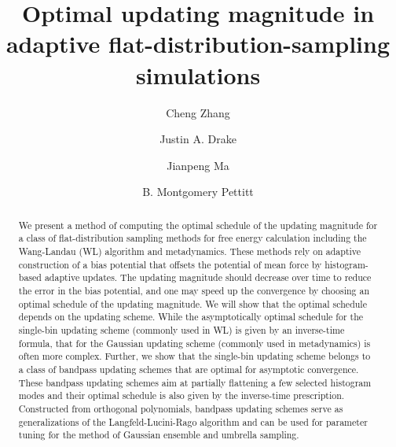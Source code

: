 \documentclass[preprint, superscriptaddress, floatfix]{revtex4-1}
\begin{document}
\title{Optimal updating magnitude in adaptive flat-distribution-sampling simulations}

\author{Cheng Zhang}
\author{Justin A. Drake}
\author{Jianpeng Ma}
\author{B. Montgomery Pettitt}



\begin{abstract}
  We present a method of computing the optimal schedule
  of the updating magnitude
  for a class of flat-distribution sampling methods
  for free energy calculation including
  the Wang-Landau (WL) algorithm and metadynamics.
  These methods rely on adaptive construction of
  a bias potential that offsets
  the potential of mean force by histogram-based adaptive updates.
  The updating magnitude should decrease over time
  to reduce the error in the bias potential,
  and one may speed up the convergence by choosing an optimal schedule
  of the updating magnitude.
  We will show that
  the optimal schedule depends on the updating scheme.
  While the asymptotically optimal schedule for
  the single-bin updating scheme (commonly used in WL)
  is given by an inverse-time formula,
  that for the Gaussian updating scheme (commonly used in metadynamics)
  is often more complex.
  Further,
  we show that the single-bin updating scheme
  belongs to a class of bandpass updating schemes
  that are optimal for asymptotic convergence.
  These bandpass updating schemes aim at
  partially flattening a few selected histogram modes
  and their optimal schedule
  is also given by the inverse-time prescription.
  Constructed from orthogonal polynomials,
  bandpass updating schemes serve as generalizations
  of the Langfeld-Lucini-Rago algorithm
  and can be used for parameter tuning for the method of Gaussian ensemble
  and umbrella sampling.
\end{abstract}
\end{document}
